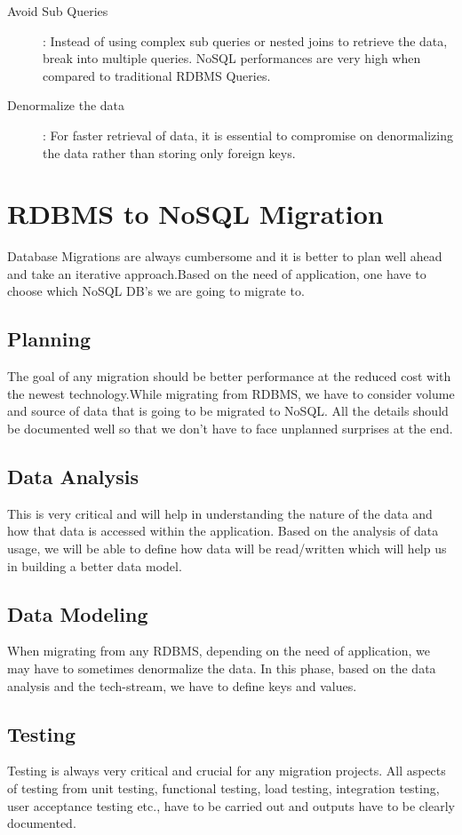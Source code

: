 \documentclass[sigconf]{acmart}
\begin{document}
\begin{description}
    \item[Avoid Sub Queries]: Instead of using complex sub queries or nested joins to retrieve the data, break into multiple queries. NoSQL performances are very high when compared to traditional RDBMS Queries.
    \item[Denormalize the data]: For faster retrieval of data, it is essential to compromise on denormalizing the data rather than storing only foreign keys.
    
\end{description}


\section{RDBMS to NoSQL Migration}
Database Migrations are always cumbersome and it is better to plan well ahead and take an iterative approach.Based on the need of application, one have to choose which NoSQL DB's we are going to migrate to. \cite{aws}
\subsection{Planning}  
The goal of any migration should be better performance at the reduced cost with the newest technology.While migrating from RDBMS, we have to consider volume and source of data that is going to be migrated to NoSQL. All the details should be documented well so that we don't have to face unplanned surprises at the end.
\subsection{Data Analysis} 
This is very critical and will help in understanding the nature of the data and how that data is accessed within the application. Based on the analysis of data usage, we will be able to define how data will be read/written which will help us in building a better data model.
\subsection{Data Modeling} 
When migrating from any RDBMS, depending on the need of application, we may have to sometimes denormalize the data. In this phase, based on the data analysis and the tech-stream, we have to define keys and values.
\subsection{Testing} 
Testing is always very critical and crucial for any migration projects. All aspects of testing from unit testing, functional testing, load testing, integration testing, user acceptance testing etc., have to be carried out and outputs have to be clearly documented. 
\end{document}
